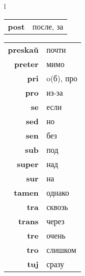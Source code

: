 \documentclass{article}
\begin{document}
\begin{center}
\begin{tabular}{l}
\begin{tabular}{>{\bfseries}rl}
post & после, за \\
\end{tabular}
\hspace{-2em}
\begin{tabular}{>{\bfseries}rl}
preskaŭ & почти \\
preter & мимо \\
pri & o(б), про \\
pro & из-за \\
se & если \\
sed & но \\
sen & без \\
sub & под \\
super & над \\
sur & на \\
tamen & однако \\
tra & сквозь \\
trans & через \\
tre & очень \\
tro & слишком \\
tuj & сразу \\
\end{tabular}
\vspace{0.5em}\\


\end{tabular}
\end{center}
\end{document}
